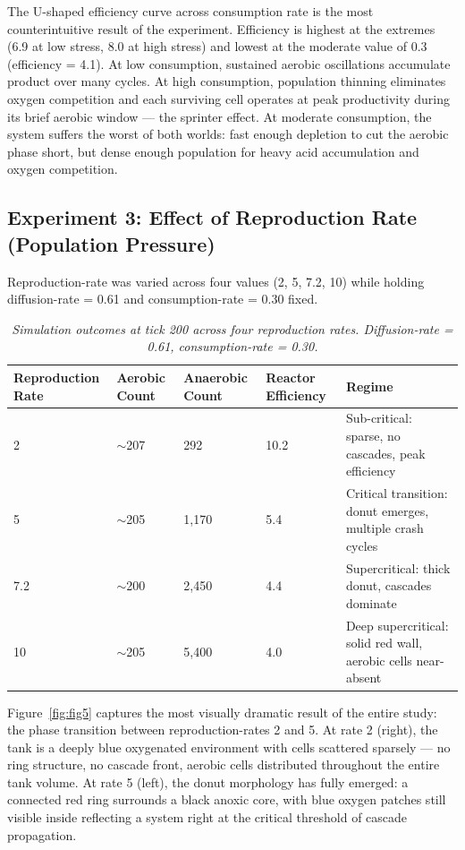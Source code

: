 \documentclass[12pt]{article}
\begin{document}
The U-shaped efficiency curve across consumption rate is the most counterintuitive result of the experiment. Efficiency is highest at the extremes (6.9 at low stress, 8.0 at high stress) and lowest at the moderate value of 0.3 (efficiency = 4.1). At low consumption, sustained aerobic oscillations accumulate product over many cycles. At high consumption, population thinning eliminates oxygen competition and each surviving cell operates at peak productivity during its brief aerobic window --- the sprinter effect. At moderate consumption, the system suffers the worst of both worlds: fast enough depletion to cut the aerobic phase short, but dense enough population for heavy acid accumulation and oxygen competition.

\subsection{Experiment 3: Effect of Reproduction Rate (Population Pressure)}

Reproduction-rate was varied across four values (2, 5, 7.2, 10) while holding diffusion-rate = 0.61 and consumption-rate = 0.30 fixed.

\begin{table}[H]
  \centering
  \caption{\textit{Simulation outcomes at tick 200 across four reproduction rates. Diffusion-rate = 0.61, consumption-rate = 0.30.}}
  \label{tab:table3}
  \small
  \begin{tabular}{|p{1.7cm}|p{1.5cm}|p{1.7cm}|p{1.7cm}|p{4.8cm}|}
    \hline
    \textbf{Reproduction Rate} & \textbf{Aerobic Count} & \textbf{Anaerobic Count} & \textbf{Reactor Efficiency} & \textbf{Regime} \\
    \hline
    2   & $\sim$207 & 292   & 10.2 & Sub-critical: sparse, no cascades, peak efficiency \\
    \hline
    5   & $\sim$205 & 1,170 & 5.4  & Critical transition: donut emerges, multiple crash cycles \\
    \hline
    7.2 & $\sim$200 & 2,450 & 4.4  & Supercritical: thick donut, cascades dominate \\
    \hline
    10  & $\sim$205 & 5,400 & 4.0  & Deep supercritical: solid red wall, aerobic cells near-absent \\
    \hline
  \end{tabular}
\end{table}

Figure~\ref{fig:fig5} captures the most visually dramatic result of the entire study: the phase transition between reproduction-rates 2 and 5. At rate 2 (right), the tank is a deeply blue oxygenated environment with cells scattered sparsely --- no ring structure, no cascade front, aerobic cells distributed throughout the entire tank volume. At rate 5 (left), the donut morphology has fully emerged: a connected red ring surrounds a black anoxic core, with blue oxygen patches still visible inside reflecting a system right at the critical threshold of cascade propagation.
\end{document}
